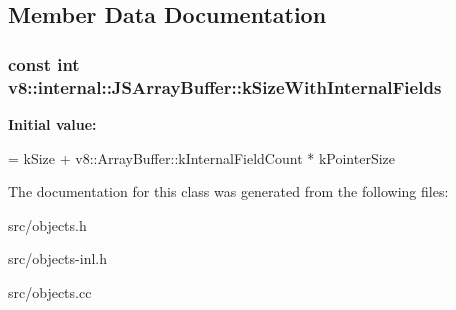 \subsection{Member Data Documentation}
\hypertarget{classv8_1_1internal_1_1_j_s_array_buffer_ac674e35a2344b89961113e8d60edf0a9}{}
\subsubsection[{k\+Size\+With\+Internal\+Fields}]{\setlength{\rightskip}{0pt plus 5cm}const int v8\+::internal\+::\+J\+S\+Array\+Buffer\+::k\+Size\+With\+Internal\+Fields\hspace{0.3cm}{\ttfamily [static]}}\label{classv8_1_1internal_1_1_j_s_array_buffer_ac674e35a2344b89961113e8d60edf0a9}
{\bfseries Initial value\+:}
\begin{DoxyCode}
=
      kSize + v8::ArrayBuffer::kInternalFieldCount * kPointerSize
\end{DoxyCode}


The documentation for this class was generated from the following files\+:\begin{DoxyCompactItemize}
\item 
src/objects.\+h\item 
src/objects-\/inl.\+h\item 
src/objects.\+cc\end{DoxyCompactItemize}
